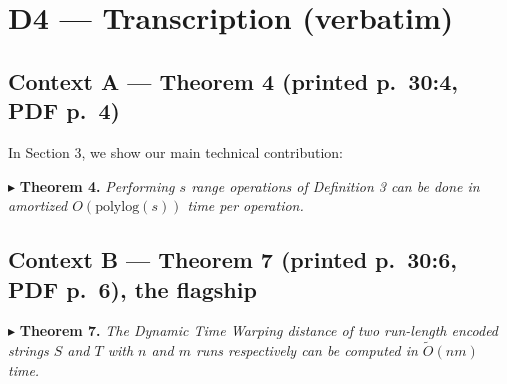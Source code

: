 \documentclass[11pt]{article}
\newcommand{\poly}{\ensuremath{\mathrm{polylog}}}
\newcommand{\Fset}{\ensuremath{\mathsf{F}}}
\begin{document}
\section*{D4 --- Transcription (verbatim)}

\subsection*{Context A --- Theorem 4 (printed p.~30:4, PDF p.~4)}

In Section 3, we show our main technical contribution:

\smallskip
$\blacktriangleright$ \textbf{Theorem 4.} \emph{Performing $s$ range operations of Definition 3 can be done in amortized $O(\poly(s))$ time per operation.}

\smallskip

\subsection*{Context B --- Theorem 7 (printed p.~30:6, PDF p.~6), the flagship}

$\blacktriangleright$ \textbf{Theorem 7.} \emph{The Dynamic Time Warping distance of two run-length encoded strings $S$ and $T$ with $n$ and $m$ runs respectively can be computed in $\tilde{O}(nm)$ time.}

\medskip
\end{document}

